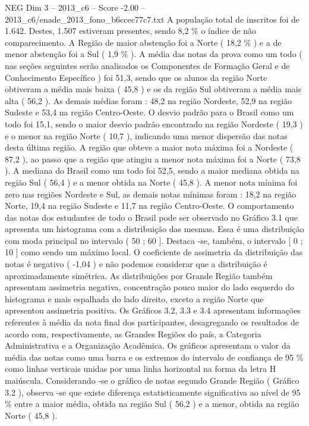 \begin{textsample}{NEG Dim 3 – 2013\_c6 – Score -2.00 – 2013\_c6/enade\_2013\_fono\_b6ccec77c7.txt}
A população total de inscritos foi de 1.642.
Destes, 1.507 estiveram presentes, sendo 8,2 \% o índice de não comparecimento.
A Região de maior abstenção foi a Norte ( 18,2 \% ) e a de menor abstenção foi a Sul ( 1,9 \% ).
A média das notas da prova como um todo ( nas seções seguintes serão analisados os Componentes de Formação Geral e de Conhecimento Específico ) foi 51,3, sendo que os alunos da região Norte obtiveram a média mais baixa ( 45,8 ) e os da região Sul obtiveram a média mais alta ( 56,2 ).
As demais médias foram : 48,2 na região Nordeste, 52,9 na região Sudeste e 53,4 na região Centro-Oeste.
O desvio padrão para o Brasil como um todo foi 15,1, sendo o maior desvio padrão encontrado na região Nordeste ( 19,3 ) e o menor na região Norte ( 10,7 ), indicando uma menor dispersão das notas desta última região.
A região que obteve a maior nota máxima foi a Nordeste ( 87,2 ), ao passo que a região que atingiu a menor nota máxima foi a Norte ( 73,8 ).
A mediana do Brasil como um todo foi 52,5, sendo a maior mediana obtida na região Sul ( 56,4 ) e a menor obtida na Norte ( 45,8 ).
A menor nota mínima foi zero nas regiões Nordeste e Sul, as demais notas mínimas foram : 18,2 na região Norte, 19,4 na região Sudeste e 11,7 na região Centro-Oeste.
O comportamento das notas dos estudantes de todo o Brasil pode ser observado no Gráfico 3.1 que apresenta um histograma com a distribuição das mesmas.
Essa é uma distribuição com moda principal no intervalo ( 50 ; 60 ].
Destaca -se, também, o intervalo [ 0 ; 10 ] como sendo um máximo local.
O coeficiente de assimetria da distribuição das notas é negativo ( -1,04 ) e não podemos considerar que a distribuição é aproximadamente simétrica.
As distribuições por Grande Região também apresentam assimetria negativa, concentração pouco maior do lado esquerdo do histograma e mais espalhada do lado direito, exceto a região Norte que apresentou assimetria positiva.
Os Gráficos 3.2, 3.3 e 3.4 apresentam informações referentes à média da nota final dos participantes, desagregando os resultados de acordo com, respectivamente, as Grandes Regiões do país, a Categoria Administrativa e a Organização Acadêmica.
Os gráficos apresentam o valor da média das notas como uma barra e os extremos do intervalo de confiança de 95 \% como linhas verticais unidas por uma linha horizontal na forma da letra H maiúscula.
Considerando -se o gráfico de notas segundo Grande Região ( Gráfico 3.2 ), observa -se que existe diferença estatisticamente significativa ao nível de 95 \% entre a maior média, obtida na região Sul ( 56,2 ) e a menor, obtida na região Norte ( 45,8 ).

\end{textsample}
